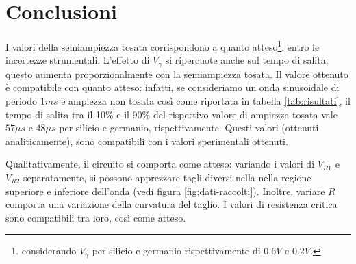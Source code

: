 \section{Conclusioni}\label{sec:conclusioni}
I valori della semiampiezza tosata corrispondono a quanto atteso\footnote{considerando $V_\gamma$ per silicio e germanio
rispettivamente di $0.6V$ e $0.2V$.}, entro
le incertezze strumentali.
L'effetto di $V_\gamma$ si ripercuote anche
sul tempo di salita: questo aumenta proporzionalmente con la semiampiezza tosata.
Il valore ottenuto è compatibile con quanto atteso:
infatti, se consideriamo un onda sinusoidale di periodo $1ms$ e ampiezza non tosata
così come riportata in tabella \ref{tab:risultati}, il tempo di salita
tra il 10\% e il 90\% del rispettivo valore di ampiezza tosata vale
$57\mu s$ e $48 \mu s$ per silicio e germanio, rispettivamente.
Questi valori (ottenuti analiticamente), sono compatibili con i valori sperimentali ottenuti.

Qualitativamente, il circuito si comporta come atteso: variando i valori di
$V_{R1}$ e $V_{R2}$ separatamente, si possono apprezzare tagli diversi nella
nella regione superiore e inferiore dell'onda (vedi figura \ref{fig:dati-raccolti}).
Inoltre, variare $R$ comporta una variazione della curvatura del taglio.
I valori di resistenza critica sono compatibili tra loro, così come atteso.
